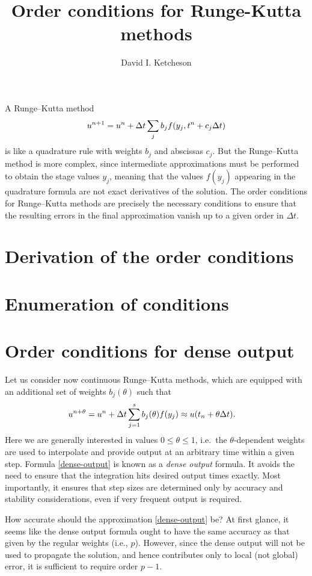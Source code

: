 \documentclass[12pt]{article}
\begin{document}
\title{Order conditions for Runge-Kutta methods}
\author{David I. Ketcheson} 
\maketitle



A Runge--Kutta method 
$$
u^{n+1} = u^n + \Delta t \sum_j b_j f(y_j, t^n + c_j \Delta t)
$$
is like a quadrature rule with weights $b_j$ and
abscissas $c_j$.  But the Runge--Kutta method is more complex, since 
intermediate approximations must be performed to obtain the stage values
$y_j$, meaning that the values $f(y_j)$ appearing in the quadrature formula
are not exact derivatives of the
solution.  The order conditions for Runge--Kutta methods are precisely 
the necessary conditions to ensure that the resulting errors in the final
approximation vanish up to a given order in $\Delta t$.

\section{Derivation of the order conditions\label{sec:rkoc}}
  

\section{Enumeration of conditions}
  

\section{Order conditions for dense output}
Let us consider now continuous Runge--Kutta methods, which are equipped
with an additional set of weights $b_j(\theta)$ such that
\begin{align} \label{dense-output}
    u^{n+\theta} & = u^n + \Delta t \sum_{j=1}^s b_j(\theta) f(y_j) \approx u(t_n + \theta \Delta t).
\end{align}
Here we are generally interested in values $0\le \theta \le 1$, i.e.\ the
$\theta$-dependent weights are used to interpolate and provide output
at an arbitrary time within a given step.  Formula \eqref{dense-output}
is known as a {\em dense output} formula.  It avoids the need to ensure
that the integration hits desired output times exactly.  Most importantly,
it ensures that step sizes are determined only by accuracy and stability
considerations, even if very frequent output is required.

How accurate should the approximation \eqref{dense-output} be?
At first glance, it seems like the dense output formula ought
to have the same accuracy as that given by the regular weights (i.e., $p$).
However, since the dense output will not be used to propagate the solution,
and hence contributes only to local (not global) error, it is sufficient
to require order $p-1$.
\end{document}
